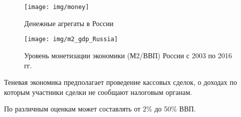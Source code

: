 \documentclass[_DKB_p1_Money.tex]{subfiles}
\begin{document}
\begin{frame}
\begin{figure}
\center
\texttt{[image: img/money]}
\caption{Денежные агрегаты в России}
\end{figure}
\end{frame}

\begin{frame}
\begin{figure}
\center
\texttt{[image: img/m2\_gdp\_Russia]}
\caption{Уровень монетизации экономики (М2/ВВП) России с 2003 по 2016 гг.}
\end{figure}
\end{frame}

\begin{frame}
\begin{block}{Теневая экономика}
\quad
предполагает проведение кассовых сделок, о доходах по которым участники сделки не сообщают налоговым органам.

По различным оценкам может составлять от 2\% до 50\% ВВП.
\end{block}
\end{frame}


\end{document}
